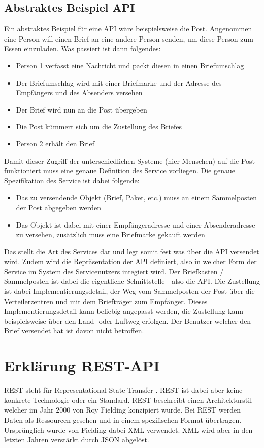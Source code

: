 \documentclass[bachelor, german ]{hgbthesis}
\begin{document}
\subsection{Abstraktes Beispiel API}
Ein abstraktes Beispiel für eine API wäre beispielsweise die Post. Angenommen eine Person will einen Brief an eine andere Person senden, um diese Person zum Essen einzuladen. Was passiert ist dann folgendes:
\begin{itemize}
 \item Person 1 verfasst eine Nachricht und packt diesen in einen Briefumschlag
 \item Der Briefumschlag wird mit einer Briefmarke und der Adresse des Empfängers und des Absenders versehen
 \item Der Brief wird nun an die Post übergeben
 \item Die Post kümmert sich um die Zustellung des Briefes
 \item Person 2 erhält den Brief
\end{itemize}

Damit dieser Zugriff der unterschiedlichen Systeme (hier Menschen) auf die Post funktioniert muss eine genaue Definition des Service vorliegen. Die genaue Spezifikation des Service ist dabei folgende:
\begin{itemize}
 \item Das zu versendende Objekt (Brief, Paket, etc.) muss an einem Sammelposten der Post abgegeben werden
 \item Das Objekt ist dabei mit einer Empfängeradresse und einer Absenderadresse zu versehen, zusätzlich muss eine Briefmarke gekauft werden
\end{itemize}
Das stellt die Art des Services dar und legt somit fest was über die API versendet wird. Zudem wird die Repräsentation der API definiert, also in welcher Form der Service im System des Servicenutzers integiert wird.
Der Briefkasten / Sammelposten ist dabei die eigentliche Schnittstelle - also die API. Die Zustellung ist dabei Implementierungsdetail, der Weg vom Sammelposten der Post über die Verteilerzentren und mit dem Briefträger zum Empfänger.
Dieses Implementierungsdetail kann beliebig angepasst werden, die Zustellung kann beispielsweise über den Land- oder Luftweg erfolgen. Der Benutzer welcher den Brief versendet hat ist davon nicht betroffen.

\section{Erklärung REST-API}
REST steht für Representational State Transfer \cite{wheeler1952use}. REST ist dabei aber keine konkrete Technologie oder ein Standard. REST beschreibt einen Architekturstil welcher im Jahr 2000 von Roy Fielding konzipiert wurde.
Bei REST werden Daten als Ressourcen gesehen und in einem spezifischen Format übertragen. Ursprünglich wurde von Fielding dabei XML verwendet. XML wird aber in den letzten Jahren verstärkt durch JSON abgelöst.
\newline
\end{document}
